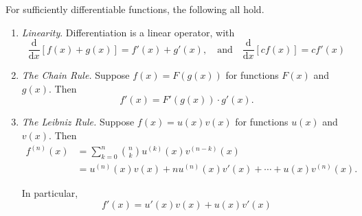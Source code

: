 \documentclass[a4paper]{scrartcl}
\newcommand{\dd}{\mathrm{d}}
\begin{document}
\begin{theorem}
	For sufficiently differentiable functions, the following all hold.
	\begin{enumerate}[label=(\roman*)]
		\item \emph{Linearity}. Differentiation is a linear operator, with
		$$
		\frac{\dd}{\dd x} \left[f(x) + g(x)\right] = f'(x) + g'(x), \quad \text{and} \quad \frac{\dd}{\dd x} \left[cf(x)\right] = cf'(x)
		$$
		\item \emph{The Chain Rule.} Suppose $f(x) = F(g(x))$ for functions $F(x)$ and $g(x)$. Then
		$$
			f'(x) = F'(g(x))\cdot g'(x).
		$$
		\item \emph{The Leibniz Rule.} 	Suppose $f(x) = u(x)v(x)$ for functions $u(x)$ and $v(x)$. Then
		\begin{align*}
			f^{(n)}(x) &= \sum_{k = 0}^n \binom{n}{k} u^{(k)} (x) v^{(n - k)}(x)\\
			&= u^{(n)}(x) v(x) + n u^{(n)}(x) v'(x) + \cdots + u(x)v^{(n)}(x).
		\end{align*}

		In particular, 
		$$
		f'(x) = u'(x)v(x) + u(x)v'(x)
		$$
	\end{enumerate}
\end{theorem}







\end{document}
